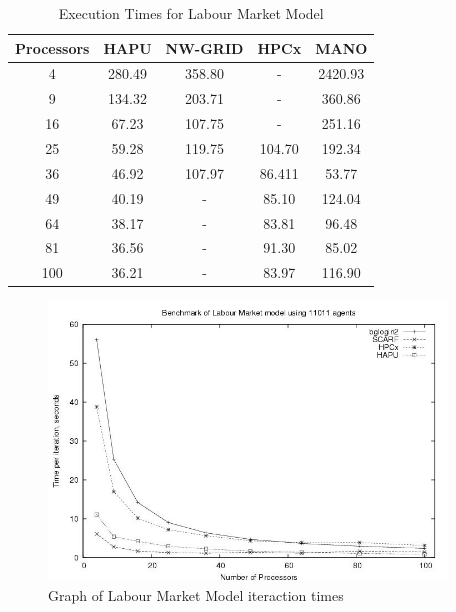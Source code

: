 {
\renewcommand{\arraystretch}{1.25}
\begin{table}[ht]
	\centering
		\begin{tabular}{c|cccc}
		Processors		&HAPU		&NW-GRID		&HPCx		&MANO			\\ \hline
		4							&280.49	&358.80 		&- 			&2420.93 	\\
		9 						&134.32	&203.71			&-			&360.86		\\
		16 						&67.23	&107.75			&-			&251.16		\\
		25 						&59.28	&119.75			&104.70	&192.34		\\
		36 						&46.92	&107.97			&86.411	&53.77		\\
		49 						&40.19	&-					&85.10	&124.04		\\
		64 						&38.17	&-					&83.81	&96.48	 	\\
		81 						&36.56	&-					&91.30	&85.02		\\
		100 					&36.21	&-					&83.97	&116.90		\\
	\end{tabular}
	\caption{Execution Times for Labour Market Model}
	\label{tab:ExecutionTimesForLabour}
\end{table}
}
\bigskip
\begin{figure}[ht]
	\centering
		\includegraphics[width=300pt]{Labour-graph.jpg}
	\caption{Graph of Labour Market Model iteraction times}
	\label{fig:Labour-graph}
\end{figure}

